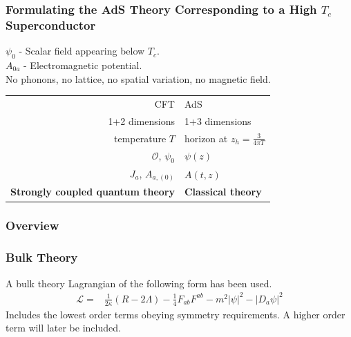 \documentclass{beamer}
\begin{document}
\begin{frame}
\frametitle{Formulating the AdS Theory Corresponding to a High $T_c$ Superconductor}
$\psi_{0}$ - Scalar field appearing below $T_c$.\\
$A_{0a}$ - Electromagnetic potential.\\
No phonons, no lattice, no spatial variation, no magnetic field.\\
\vspace{1cm}
\begin{tabular}{ r | l }
CFT & AdS \\
1+2 dimensions & 1+3 dimensions\\
temperature $T$ & horizon at $z_h=\frac{3}{4\pi T}$ \\
$\mathcal{O}$, $\psi_{0}$&$\psi(z)$\\
$J_a$, $A_{a,(0)}$&$A(t,z)$\\
{\bf Strongly coupled quantum theory} & {\bf Classical theory}
\end{tabular}
\end{frame}

\begin{frame}
\frametitle{Overview}
\begin{figure}
 \centering
{}
\end{figure}
\end{frame}

\begin{frame}
\frametitle{Bulk Theory}
A bulk theory Lagrangian of the following form has been used.
\begin{eqnarray}
 \mathcal{L}=&\frac{1}{2\kappa}\left(R-2\Lambda\right)-\frac{1}{4}F_{ab}F^{ab}-m^2|\psi|^2-|D_a\psi|^2
\label{L}
\end{eqnarray}
Includes the lowest order terms obeying symmetry requirements. A higher order term will later be included.
\end{frame}
\end{document}
